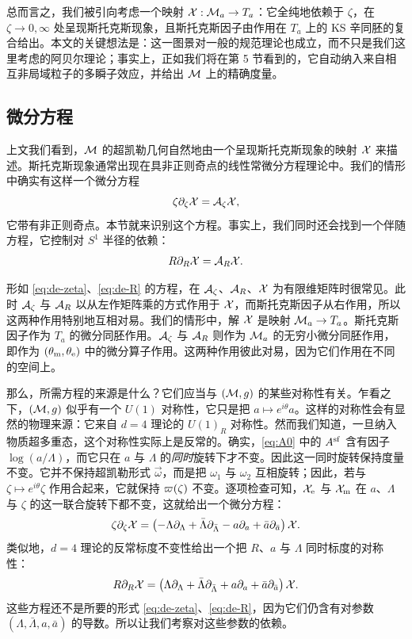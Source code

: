 总而言之，我们被引向考虑一个映射 $\mathcal{X}: \mathcal{M}_a \to T_a$：它全纯地依赖于 $\zeta$，在 $\zeta \to 0, \infty$ 处呈现斯托克斯现象，且斯托克斯因子由作用在 $T_a$ 上的 KS 辛同胚的复合给出。本文的关键想法是：这一图景对一般的规范理论也成立，而不只是我们这里考虑的阿贝尔理论；事实上，正如我们将在第 5 节看到的，它自动纳入来自相互非局域粒子的多瞬子效应，并给出 $\mathcal{M}$ 上的精确度量。%

\subsection{微分方程}

上文我们看到，$\mathcal{M}$ 的超凯勒几何自然地由一个呈现斯托克斯现象的映射 $\mathcal{X}$ 来描述。斯托克斯现象通常出现在具非正则奇点的线性常微分方程理论中。我们的情形中确实有这样一个微分方程
\begin{equation} \label{eq:de-zeta}
\zeta \partial_\zeta \mathcal{X} = \mathcal{A}_\zeta \mathcal{X},
\end{equation}
它带有非正则奇点。本节就来识别这个方程。事实上，我们同时还会找到一个伴随方程，它控制对 $S^1$ 半径的依赖：
\begin{equation} \label{eq:de-R}
R \partial_R \mathcal{X} = \mathcal{A}_R \mathcal{X}.
\end{equation}

形如 \eqref{eq:de-zeta}、\eqref{eq:de-R} 的方程，在 $\mathcal{A}_\zeta$、$\mathcal{A}_R$、$\mathcal{X}$ 为有限维矩阵时很常见。此时 $\mathcal{A}_\zeta$ 与 $\mathcal{A}_R$ 以从左作矩阵乘的方式作用于 $\mathcal{X}$，而斯托克斯因子从右作用，所以这两种作用特别地互相对易。我们的情形中，解 $\mathcal{X}$ 是映射 $\mathcal{M}_a \to T_a$。斯托克斯因子作为 $T_a$ 的微分同胚作用。$\mathcal{A}_\zeta$ 与 $\mathcal{A}_R$ 则作为 $\mathcal{M}_a$ 的无穷小微分同胚作用，即作为 $(\theta_{\mathrm{m}}, \theta_{\mathrm{e}})$ 中的微分算子作用。这两种作用彼此对易，因为它们作用在不同的空间上。

那么，所需方程的来源是什么？它们应当与 $(\mathcal{M}, g)$ 的某些对称性有关。乍看之下，$(\mathcal{M}, g)$ 似乎有一个 $U(1)$ 对称性，它只是把 $a \mapsto e^{i \theta} a$。这样的对称性会有显然的物理来源：它来自 $d=4$ 理论的 $U(1)_R$ 对称性。然而我们知道，一旦纳入物质超多重态，这个对称性实际上是反常的。确实，\eqref{eq:A0} 中的 $A^{\mathrm{sf}}$ 含有因子 $\log(a/\Lambda)$，而它只在 $a$ 与 $\Lambda$ 的\emph{同时}旋转下才不变。因此这一同时旋转保持度量不变。它并不保持超凯勒形式 $\vec{\omega}$，而是把 $\omega_1$ 与 $\omega_2$ 互相旋转；因此，若与 $\zeta \mapsto e^{i \theta} \zeta$ 作用合起来，它就保持 $\varpi(\zeta)$ 不变。逐项检查可知，$\mathcal{X}_{\mathrm{e}}$ 与 $\mathcal{X}_{\mathrm{m}}$ 在 $a$、$\Lambda$ 与 $\zeta$ 的这一联合旋转下都不变，这就给出一个微分方程：
\begin{equation} \label{eq:R-symmetry}
\zeta\partial_{\zeta} \mathcal{X} = \left( -\Lambda\partial_{\Lambda} + \bar\Lambda\partial_{\bar\Lambda} - a\partial_{a} + \bar a\partial_{\bar a} \right) \mathcal{X}.
\end{equation}
类似地，$d=4$ 理论的反常标度不变性给出一个把 $R$、$a$ 与 $\Lambda$ 同时标度的对称性：
\begin{equation} \label{eq:conformal-symmetry}
R\partial_{R} \mathcal{X} = \left( \Lambda\partial_{\Lambda} + \bar\Lambda\partial_{\bar\Lambda} + a\partial_{a} + \bar a\partial_{\bar a} \right) \mathcal{X}.
\end{equation}
这些方程还不是所要的形式 \eqref{eq:de-zeta}、\eqref{eq:de-R}，因为它们仍含有对参数 $(\Lambda, \bar\Lambda, a, \bar a)$ 的导数。所以让我们考察对这些参数的依赖。

